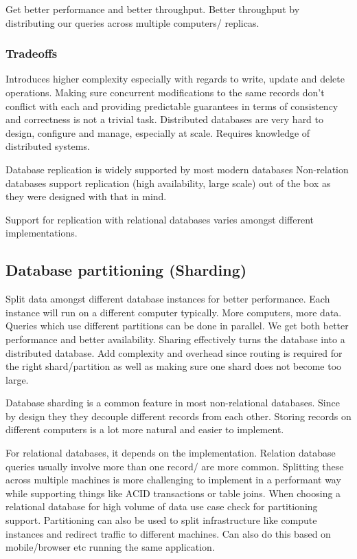 \documentclass[a4paper, 11pt]{book}
\begin{document}
    Get better performance and better throughput.
    Better throughput by distributing our queries across multiple computers/ replicas.

    \subsubsection{Tradeoffs}
    Introduces higher complexity especially with regards to write, update and delete operations.
    Making sure concurrent modifications to the same records don't conflict with each and providing predictable guarantees in terms of consistency and correctness is not a trivial task.
    Distributed databases are very hard to design, configure and manage, especially at scale.
    Requires knowledge of distributed systems.

    Database replication is widely supported by most modern databases
    Non-relation databases support replication (high availability, large scale) out of the box as they were designed with that in mind.

    Support for replication with relational databases varies amongst different implementations.

    \subsection{Database partitioning (Sharding)}
    Split data amongst different database instances for better performance.
    Each instance will run on a different computer typically.
    More computers, more data.
    Queries which use different partitions can be done in parallel.
    We get both better performance and better availability.
    Sharing effectively turns the database into a distributed database.
    Add complexity and overhead since routing is required for the right shard/partition as well as making sure one shard does not become too large.

    Database sharding is a common feature in most non-relational databases.
    Since by design they they decouple different records from each other.
    Storing records on different computers is a lot more natural and easier to implement.

    For relational databases, it depends on the implementation.
    Relation database queries usually involve more than one record/ are more common.
    Splitting these across multiple machines is more challenging to implement in a performant way while supporting things like ACID transactions or table joins.
    When choosing a relational database for high volume of data use case check for partitioning support.
    Partitioning can also be used to split infrastructure like compute instances and redirect traffic to different machines.
    Can also do this based on mobile/browser etc running the same application.
\end{document}
